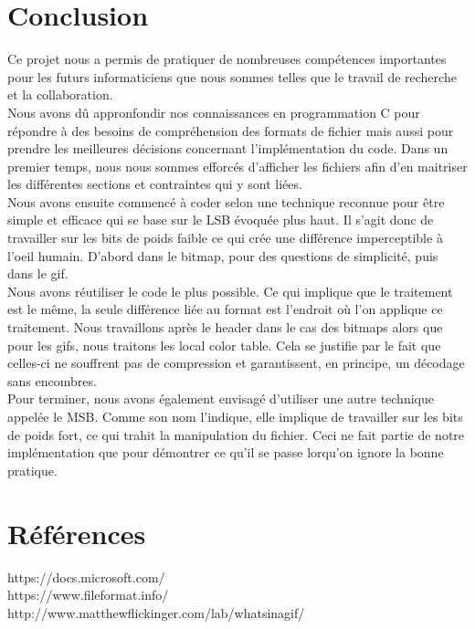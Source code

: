 \section {Conclusion}
Ce projet nous a permis de pratiquer de nombreuses compétences importantes pour les futurs informaticiens que nous sommes
telles que le travail de recherche et la collaboration.\\

Nous avons dû appronfondir nos connaissances en programmation C pour répondre à des besoins de compréhension des formats 
de fichier mais aussi pour prendre les meilleures décisions concernant l'implémentation du code.
Dans un premier temps, nous nous sommes efforcés d'afficher les fichiers afin d'en maitriser les différentes sections
et contraintes qui y sont liées.\\

Nous avons ensuite commencé à coder selon une technique reconnue pour être simple et efficace qui se base sur le LSB évoquée
plus haut. Il s'agit donc de travailler sur les bits de poids faible ce qui crée une différence imperceptible à l'oeil humain.
D'abord dans le bitmap, pour des questions de simplicité, puis dans le gif.\\

Nous avons réutiliser le code le plus possible. 
Ce qui implique que le traitement est le même, la seule différence liée au format est l'endroit où l'on applique ce traitement.
Nous travaillons après le header dans le cas des bitmaps alors que pour les gifs, nous traitons les local color table.
Cela se justifie par le fait que celles-ci ne souffrent pas de compression et garantissent, en principe, un décodage sans encombres.\\

Pour terminer, nous avons également envisagé d'utiliser une autre technique appelée le MSB. 
Comme son nom l'indique, elle implique de travailler sur les bits de poids fort, ce qui trahit la manipulation du fichier. 
Ceci ne fait partie de notre implémentation que pour démontrer ce qu'il se passe lorqu'on ignore la bonne pratique.
 
\vspace {5cm}

\section {Références}
https://docs.microsoft.com/\\
https://www.fileformat.info/\\
http://www.matthewflickinger.com/lab/whatsinagif/\\